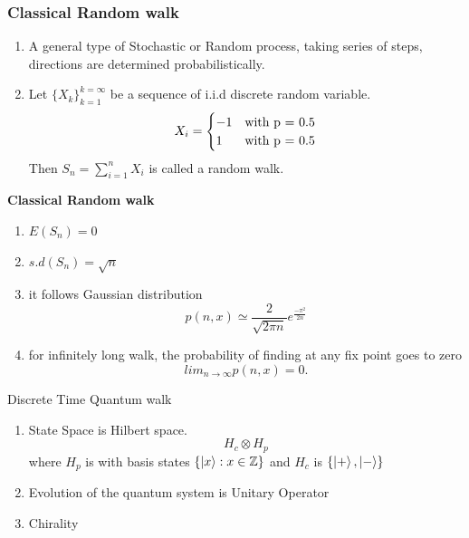 \documentclass[xcolor=svgnames]{beamer}
\newcommand{\tens}[1]{
  \mathbin{\mathop{\otimes}\limits_{#1}}}
\begin{document}




\begin{frame}
\frametitle{\textbf{Classical Random walk}}
\begin{enumerate}
    \item A general type of Stochastic or Random process, taking series of steps, directions are determined probabilistically.
    \item Let $\{X_k\}_{k=1}^{k=\infty}$ be a sequence of i.i.d discrete random variable.
    \[
        X_i =  \begin{cases}
                -1 & $with p = 0.5$\\
                 1 & $with p = 0.5$
            \end{cases}
    \]
    Then $S_n = \sum_{i=1}^{n}X_i$ is called a random walk.
\end{enumerate}
\end{frame}


\begin{frame}{\textbf{Classical Random walk}}
\begin{enumerate}
    \item $E(S_n) = 0$
    \item $s.d(S_n) = \sqrt{n}$
    \item it follows Gaussian distribution $$ p(n,x) \simeq \frac{2}{\sqrt{2\pi n}} e^{\frac{-\pi^{2}}{2n}} $$
    \item for infinitely long walk, the probability of finding at any fix point goes to zero $$ lim_{n\rightarrow\infty}p(n,x) = 0.$$
\end{enumerate}
    
\end{frame}

\begin{frame}{Discrete Time Quantum walk}
\begin{enumerate}
    \item State Space is Hilbert space. $$H_c \tens{} H_p$$ where $H_p$ is with basis states $\{\ket{x} : x \in \mathbb{Z}\}$ and $H_c$ is $\{\ket{+},\ket{-}\}$
    \item Evolution of the quantum system is Unitary Operator
    \item Chirality
    
\end{enumerate}
    
\end{frame}
\end{document}
